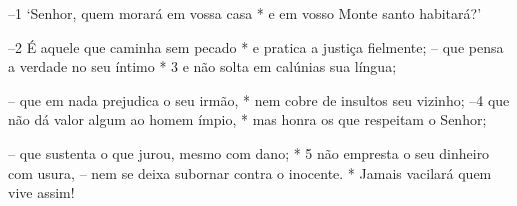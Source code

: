 –1 ‘Senhor, quem morará em vossa casa *
e em vosso Monte santo habitará?’ 

–2 É aquele que caminha sem pecado *
e pratica a justiça fielmente;
– que pensa a verdade no seu íntimo *
3 e não solta em calúnias sua língua; 

– que em nada prejudica o seu irmão, *
nem cobre de insultos seu vizinho;
–4 que não dá valor algum ao homem ímpio, *
mas honra os que respeitam o Senhor; 

– que sustenta o que jurou, mesmo com dano; *
5 não empresta o seu dinheiro com usura,
– nem se deixa subornar contra o inocente. *
Jamais vacilará quem vive assim!
